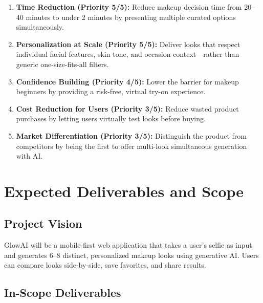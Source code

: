 \documentclass[11pt, letterpaper]{article}
\begin{document}
\begin{enumerate}[leftmargin=*, label=\textbf{\arabic*.}]
    \item \textbf{Time Reduction (Priority 5/5):} Reduce makeup decision time from 20--40 minutes to under 2 minutes by presenting multiple curated options simultaneously.
    \item \textbf{Personalization at Scale (Priority 5/5):} Deliver looks that respect individual facial features, skin tone, and occasion context---rather than generic one-size-fits-all filters.
    \item \textbf{Confidence Building (Priority 4/5):} Lower the barrier for makeup beginners by providing a risk-free, virtual try-on experience.
    \item \textbf{Cost Reduction for Users (Priority 3/5):} Reduce wasted product purchases by letting users virtually test looks before buying.
    \item \textbf{Market Differentiation (Priority 3/5):} Distinguish the product from competitors by being the first to offer multi-look simultaneous generation with AI.
\end{enumerate}

\newpage
\section{Expected Deliverables and Scope}

\subsection{Project Vision}
GlowAI will be a mobile-first web application that takes a user's selfie as input and generates 6--8 distinct, personalized makeup looks using generative AI. Users can compare looks side-by-side, save favorites, and share results.

\subsection{In-Scope Deliverables}
\end{document}
